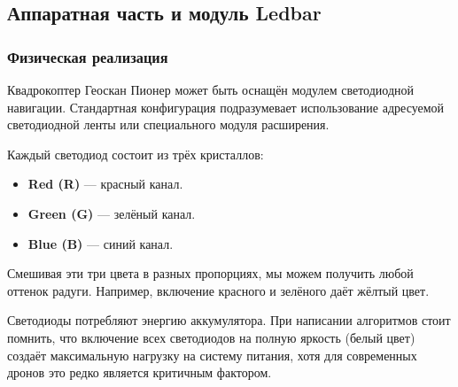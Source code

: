 \subsection{Аппаратная часть и модуль Ledbar}

\subsubsection{Физическая реализация}
Квадрокоптер Геоскан Пионер может быть оснащён модулем светодиодной навигации. Стандартная конфигурация подразумевает использование адресуемой светодиодной ленты или специального модуля расширения.

\begin{infobox}
Каждый светодиод состоит из трёх кристаллов:
\begin{itemize}
    \item \textbf{Red (R)} — красный канал.
    \item \textbf{Green (G)} — зелёный канал.
    \item \textbf{Blue (B)} — синий канал.
\end{itemize}
Смешивая эти три цвета в разных пропорциях, мы можем получить любой оттенок радуги. Например, включение красного и зелёного даёт жёлтый цвет.
\end{infobox}

\begin{warnbox}[Питание]
Светодиоды потребляют энергию аккумулятора. При написании алгоритмов стоит помнить, что включение всех светодиодов на полную яркость (белый цвет) создаёт максимальную нагрузку на систему питания, хотя для современных дронов это редко является критичным фактором.
\end{warnbox}
